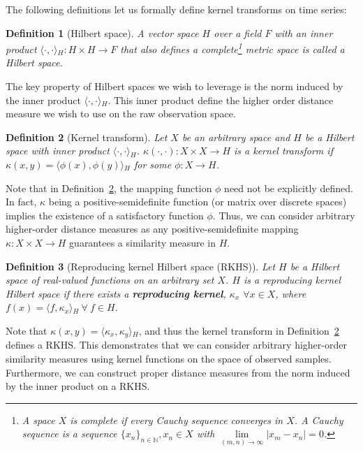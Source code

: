 \documentclass[a4paper]{article}
\newcommand{\innerproduct}[2]{\langle{}#1,#2\rangle{}}
\theoremstyle{def}
\newtheorem{definition}{Definition}
\theoremstyle{thm}
\newcommand{\N}[0]{\mathbb{N}}
\begin{document}
The following definitions let us formally define kernel transforms on time series:

\begin{definition}[Hilbert space]\label{defn:hilbert_space}
    A vector space $H$ over a field $F$ with an inner product $\innerproduct{\cdot}{\cdot}_H: H \times H \rightarrow F$ that also defines a complete\footnote{A space $X$ is complete if every Cauchy sequence  converges in $X$. A Cauchy sequence is a sequence $\{x_n\}_{n \in \N}, x_n \in X$ with $\lim\limits_{(m,n)\rightarrow\infty} |x_m - x_n| = 0$.} metric space is called a Hilbert space.
\end{definition}

The key property of Hilbert spaces we wish to leverage is the norm induced by the inner product $\innerproduct{\cdot}{\cdot}_H$.
This inner product define the higher order distance measure we wish to use on the raw observation space.

\begin{definition}[Kernel transform]\label{defn:kernel_trick}
    Let $X$ be an arbitrary space and $H$ be a Hilbert space with inner product $\innerproduct{\cdot}{\cdot}_H$.
    $\kappa(\cdot, \cdot): X \times X \rightarrow H$ is a kernel transform if $\kappa(x,y) = \innerproduct{\phi(x)}{\phi(y)}_H$ for some $\phi: X \rightarrow H$.
\end{definition}

Note that in Definition~\ref{defn:kernel_trick}, the mapping function $\phi$ need not be explicitly defined.
In fact, $\kappa$ being a positive-semidefinite function (or matrix over discrete spaces) implies the existence of a satisfactory function $\phi$.
Thus, we can consider arbitrary higher-order distance measures as any positive-semidefinite mapping $\kappa: X \times X \rightarrow H$ guarantees a similarity measure in $H$.

\begin{definition}[Reproducing kernel Hilbert space (RKHS)]\label{defn:rkhs}
    Let $H$ be a Hilbert space of real-valued functions on an arbitrary set $X$.
    $H$ is a reproducing kernel Hilbert space if there exists a \textbf{reproducing kernel}, $\kappa_x$ $\forall x \in X$, where $f(x) = \innerproduct{f}{\kappa_x}_H~\forall~f \in H$.
\end{definition}

Note that $\kappa(x,y) = \innerproduct{\kappa_x}{\kappa_y}_H$, and thus the kernel transform in Definition~\ref{defn:kernel_trick} defines a RKHS.
This demonstrates that we can consider arbitrary higher-order similarity measures using kernel functions on the space of observed samples.
Furthermore, we can construct proper distance measures from the norm induced by the inner product on a RKHS.
\end{document}
